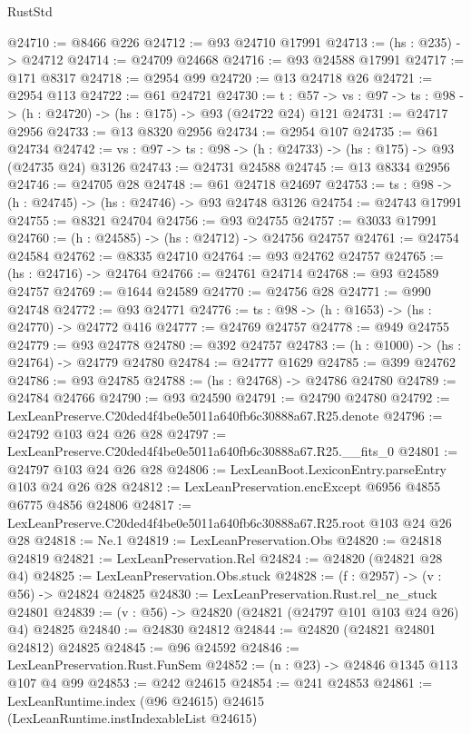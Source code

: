 \begin{lexlean}{RustStd}
\begin{coremodule}
@24710 := @8466 @226
@24712 := @93 @24710 @17991
@24713 := (hs : @235) -> @24712
@24714 := @24709 @24668
@24716 := @93 @24588 @17991
@24717 := @171 @8317
@24718 := @2954 @99
@24720 := @13 @24718 @26
@24721 := @2954 @113
@24722 := @61 @24721
@24730 := {t : @57} ->
  {vs : @97} -> {ts : @98} -> (h : @24720) -> (hs : @175) -> @93 (@24722 @24) @121
@24731 := @24717 @2956
@24733 := @13 @8320 @2956
@24734 := @2954 @107
@24735 := @61 @24734
@24742 := {vs : @97} -> {ts : @98} -> (h : @24733) -> (hs : @175) -> @93 (@24735 @24) @3126
@24743 := @24731 @24588
@24745 := @13 @8334 @2956
@24746 := @24705 @28
@24748 := @61 @24718 @24697
@24753 := {ts : @98} -> (h : @24745) -> (hs : @24746) -> @93 @24748 @3126
@24754 := @24743 @17991
@24755 := @8321 @24704
@24756 := @93 @24755
@24757 := @3033 @17991
@24760 := (h : @24585) -> (hs : @24712) -> @24756 @24757
@24761 := @24754 @24584
@24762 := @8335 @24710
@24764 := @93 @24762 @24757
@24765 := (hs : @24716) -> @24764
@24766 := @24761 @24714
@24768 := @93 @24589 @24757
@24769 := @1644 @24589
@24770 := @24756 @28
@24771 := @990 @24748
@24772 := @93 @24771
@24776 := {ts : @98} -> (h : @1653) -> (hs : @24770) -> @24772 @416
@24777 := @24769 @24757
@24778 := @949 @24755
@24779 := @93 @24778
@24780 := @392 @24757
@24783 := (h : @1000) -> (hs : @24764) -> @24779 @24780
@24784 := @24777 @1629
@24785 := @399 @24762
@24786 := @93 @24785
@24788 := (hs : @24768) -> @24786 @24780
@24789 := @24784 @24766
@24790 := @93 @24590
@24791 := @24790 @24780
@24792 := LexLeanPreserve.C20ded4f4be0e5011a640fb6c30888a67.R25.denote
@24796 := @24792 @103 @24 @26 @28
@24797 := LexLeanPreserve.C20ded4f4be0e5011a640fb6c30888a67.R25.__fits_0
@24801 := @24797 @103 @24 @26 @28
@24806 := LexLeanBoot.LexiconEntry.parseEntry @103 @24 @26 @28
@24812 := LexLeanPreservation.encExcept @6956 @4855 @6775 @4856 @24806
@24817 := LexLeanPreserve.C20ded4f4be0e5011a640fb6c30888a67.R25.root @103 @24 @26 @28
@24818 := Ne.{1}
@24819 := LexLeanPreservation.Obs
@24820 := @24818 @24819
@24821 := LexLeanPreservation.Rel
@24824 := @24820 (@24821 @28 @4)
@24825 := LexLeanPreservation.Obs.stuck
@24828 := (f : @2957) -> (v : @56) -> @24824 @24825
@24830 := LexLeanPreservation.Rust.rel_ne_stuck @24801
@24839 := (v : @56) -> @24820 (@24821 (@24797 @101 @103 @24 @26) @4) @24825
@24840 := @24830 @24812
@24844 := @24820 (@24821 @24801 @24812) @24825
@24845 := @96 @24592
@24846 := LexLeanPreservation.Rust.FunSem
@24852 := (n : @23) -> @24846 @1345 @113 @107 @4 @99
@24853 := @242 @24615
@24854 := @241 @24853
@24861 := LexLeanRuntime.index (@96 @24615) @24615 (LexLeanRuntime.instIndexableList @24615)

\end{coremodule}
\end{lexlean}
